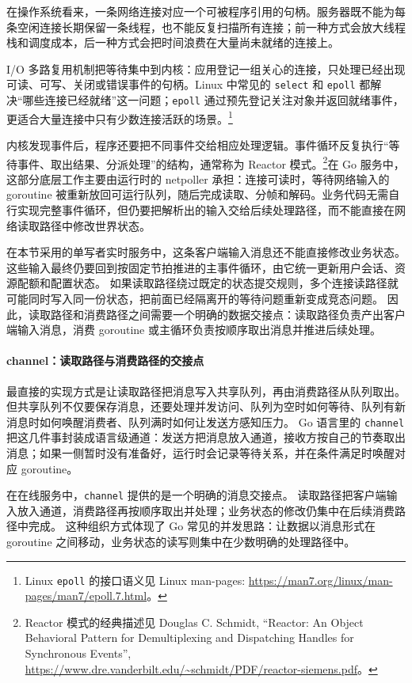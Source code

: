 在操作系统看来，一条网络连接对应一个可被程序引用的句柄。服务器既不能为每条空闲连接长期保留一条线程，也不能反复扫描所有连接；前一种方式会放大线程栈和调度成本，后一种方式会把时间浪费在大量尚未就绪的连接上。

I/O 多路复用机制把等待集中到内核：应用登记一组关心的连接，只处理已经出现可读、可写、关闭或错误事件的句柄。Linux 中常见的 \texttt{select} 和 \texttt{epoll} 都解决“哪些连接已经就绪”这一问题；\texttt{epoll} 通过预先登记关注对象并返回就绪事件，更适合大量连接中只有少数连接活跃的场景。\footnote{Linux \texttt{epoll} 的接口语义见 Linux man-pages: \url{https://man7.org/linux/man-pages/man7/epoll.7.html}。}

内核发现事件后，程序还要把不同事件交给相应处理逻辑。事件循环反复执行“等待事件、取出结果、分派处理”的结构，通常称为 Reactor 模式。\footnote{Reactor 模式的经典描述见 Douglas C. Schmidt, ``Reactor: An Object Behavioral Pattern for Demultiplexing and Dispatching Handles for Synchronous Events'', \url{https://www.dre.vanderbilt.edu/~schmidt/PDF/reactor-siemens.pdf}。}在 Go 服务中，这部分底层工作主要由运行时的 netpoller 承担：连接可读时，等待网络输入的 goroutine 被重新放回可运行队列，随后完成读取、分帧和解码。业务代码无需自行实现完整事件循环，但仍要把解析出的输入交给后续处理路径，而不能直接在网络读取路径中修改世界状态。

在本节采用的单写者实时服务中，这条客户端输入消息还不能直接修改业务状态。
这些输入最终仍要回到按固定节拍推进的主事件循环，由它统一更新用户会话、资源配额和配置状态。
如果读取路径绕过既定的状态提交规则，多个连接读路径就可能同时写入同一份状态，把前面已经隔离开的等待问题重新变成竞态问题。
因此，读取路径和消费路径之间需要一个明确的数据交接点：读取路径负责产出客户端输入消息，消费 goroutine 或主循环负责按顺序取出消息并推进后续处理。

\paragraph{channel：读取路径与消费路径的交接点}

最直接的实现方式是让读取路径把消息写入共享队列，再由消费路径从队列取出。
但共享队列不仅要保存消息，还要处理并发访问、队列为空时如何等待、队列有新消息时如何唤醒消费者、队列满时如何让发送方感知压力。
Go 语言里的 \texttt{channel} 把这几件事封装成语言级通道：发送方把消息放入通道，接收方按自己的节奏取出消息；如果一侧暂时没有准备好，运行时会记录等待关系，并在条件满足时唤醒对应 goroutine。

在在线服务中，\texttt{channel} 提供的是一个明确的消息交接点。
读取路径把客户端输入放入通道，消费路径再按顺序取出并处理；业务状态的修改仍集中在后续消费路径中完成。
这种组织方式体现了 Go 常见的并发思路：让数据以消息形式在 goroutine 之间移动，业务状态的读写则集中在少数明确的处理路径中。

